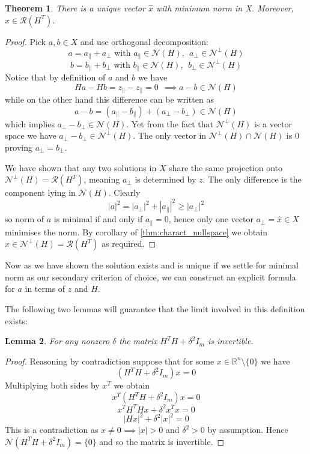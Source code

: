\documentclass[a4paper,11pt]{article}
\theoremstyle{break}
\newtheorem{theorem}{Theorem}[section]
\newtheorem{lemma}[theorem]{Lemma}
\newcommand{\R}{\mathbb{R}}
\newcommand{\Nu}{\mathcal{N}}
\newcommand{\Ra}{\mathcal{R}}
\newcommand{\pll}{\parallel}
\begin{document}
\begin{theorem}\label{thm:regression_uniqueness}
    There is a unique vector $\hat{x}$ with minimum norm in X.
    Moreover, $\hat{x} \in \Ra(H^T)$.
\end{theorem}
\begin{proof}
    Pick $a, b \in X$ and use orthogonal decomposition:
    $$ a = a_\pll + a_\perp \text{ with } a_\pll \in \Nu(H),~~ a_\perp \in \Nu^\perp (H)$$
    $$ b = b_\pll + b_\perp \text{ with } b_\pll \in \Nu(H),~~ b_\perp \in \Nu^\perp (H)$$
    Notice that by definition of $a$ and $b$ we have
    $$ H a - H b = z_\pll - z_\pll = 0 ~~ \implies a - b \in \Nu(H)$$
    while on the other hand this difference can be written as
    $$ a - b = (a_\pll - b_\pll) + (a_\perp - b_\perp) \in \Nu(H)$$
    which implies $ a_\perp - b_\perp \in \Nu(H) $. Yet from the fact that $\Nu^\perp (H)$ is a vector space we have $ a_\perp - b_\perp \in \Nu^\perp (H)$. The only vector in $ \Nu^\perp (H) \cap \Nu (H)$ is $0$ proving $ a_\perp = b_\perp$.
    
    We have shown that any two solutions in $X$ share the same projection onto  $\Nu^\perp (H) = \Ra(H^T)$, meaning $a_\perp$ is determined by $z$.
    The only difference is the component lying in $\Nu(H)$. Clearly
    $$ | a |^2 = | a_\perp |^2 + |a_\pll |^2 \geq |a_\perp |^2$$
    so norm of $a$ is minimal if and only if $a_\pll = 0$, hence only one vector $a_\perp = \hat{x} \in X$ minimises the norm.
    By corollary of \ref{thm:charact_nullspace} we obtain $ \hat{x} \in \Nu^\perp (H) = \Ra(H^T) $ as required.
\end{proof}
Now as we have shown the solution exists and is unique if we settle for minimal norm as our secondary criterion of choice, we can construct an explicit formula for $a$ in terms of $z$ and $H$.


The following two lemmas will guarantee that the limit involved in this definition exists:

\begin{lemma}\label{lem:invertible_1}
    For any nonzero $\delta$ the matrix $H^T H + \delta^2  I_m$ is invertible.
    \label{thm:invertible}
\end{lemma}
\begin{proof}
    Reasoning by contradiction suppose that for some $x \in \R^n \setminus \{0\}$ we have
    $$ (H^T H + \delta^2  I_m) x = 0 $$ %
Multiplying both sides by $x^T$ we obtain
    $$ x^T (H^T H + \delta^2  I_m) x = 0 $$ %
    $$ x^T H^T H x + \delta^2 x^T x = 0 $$
    $$ | H x |^2 + \delta^2 | x |^2 = 0 $$
This is a contradiction as $ x \neq 0 \implies | x | > 0 $ and $ \delta^2 > 0$ by assumption.
Hence $\Nu(H^T H + \delta^2  I_m) = \{0\} $ and so the matrix is invertible.
\end{proof}
\end{document}
